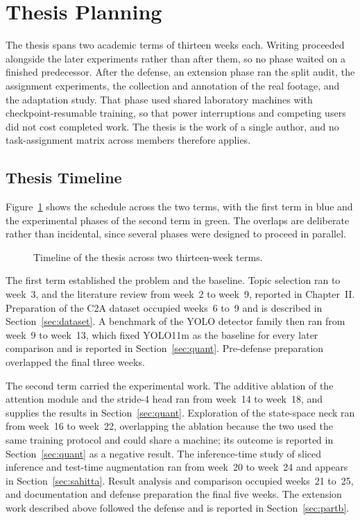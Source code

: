 \section{Thesis Planning}
The thesis spans two academic terms of thirteen weeks each. Writing proceeded
alongside the later experiments rather than after them, so no phase waited on a
finished predecessor. After the defense, an extension phase ran the split audit,
the assignment experiments, the collection and annotation of the real footage,
and the adaptation study. That phase used shared laboratory machines with
checkpoint-resumable training, so that power interruptions and competing users
did not cost completed work. The thesis is the work of a single author, and no
task-assignment matrix across members therefore applies.

\subsection{Thesis Timeline}
Figure~\ref{fig:gantt} shows the schedule across the two terms, with the first
term in blue and the experimental phases of the second term in green. The
overlaps are deliberate rather than incidental, since several phases were
designed to proceed in parallel.

\begin{figure}[tbp]
  \centering
  \resizebox{\linewidth}{!}{}
  \caption{Timeline of the thesis across two thirteen-week terms.}
  \label{fig:gantt}
\end{figure}

The first term established the problem and the baseline. Topic selection ran to
week~3, and the literature review from week~2 to week~9, reported in
Chapter~II. Preparation of the C2A dataset occupied weeks~6 to~9 and is
described in Section~\ref{sec:dataset}. A benchmark of the YOLO detector family
then ran from week~9 to week~13, which fixed YOLO11m as the baseline for every
later comparison and is reported in Section~\ref{sec:quant}. Pre-defense preparation overlapped
the final three weeks.

The second term carried the experimental work. The additive ablation of the
attention module and the stride-4 head ran from week~14 to week~18, and supplies
the results in Section~\ref{sec:quant}. Exploration of the state-space neck ran from week~16
to week~22, overlapping the ablation because the two used the same training
protocol and could share a machine; its outcome is reported in Section~\ref{sec:quant} as a
negative result. The inference-time study of sliced inference and test-time
augmentation ran from week~20 to week~24 and appears in
Section~\ref{sec:sahitta}. Result
analysis and comparison occupied weeks~21 to~25, and documentation and defense
preparation the final five weeks. The extension work described above followed
the defense and is reported in Section~\ref{sec:partb}.

